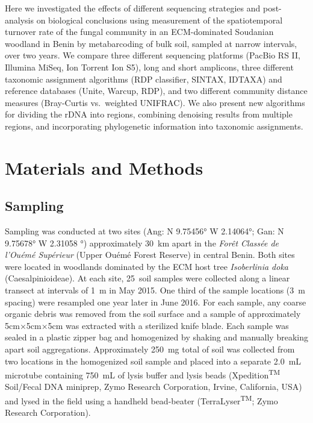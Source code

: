 \documentclass[
  12pt,
]{article}
\begin{document}
Here we investigated the effects of different sequencing strategies and post-analysis on biological conclusions using measurement of the spatiotemporal turnover rate of the fungal community in an ECM-dominated Soudanian woodland in Benin by metabarcoding of bulk soil, sampled at narrow intervals, over two years.
We compare three different sequencing platforms (PacBio RS II, Illumina MiSeq, Ion Torrent Ion S5), long and short amplicons, three different taxonomic assignment algorithms (RDP classifier, SINTAX, IDTAXA) and reference databases (Unite, Warcup, RDP), and two different community distance measures (Bray-Curtis vs.~weighted UNIFRAC).
We also present new algorithms for dividing the rDNA into regions, combining denoising results from multiple regions, and incorporating phylogenetic information into taxonomic assignments.

\hypertarget{materials-and-methods}{%
\section{Materials and Methods}\label{materials-and-methods}}

\hypertarget{sampling}{%
\subsection{Sampling}\label{sampling}}

Sampling was conducted at two sites (Ang: N 9.75456° W 2.14064°; Gan: N 9.75678° W 2.31058 °) approximately 30~km apart in the \emph{Forêt Classée de l'Ouémé Supérieur} (Upper Ouémé Forest Reserve) in central Benin.
Both sites were located in woodlands dominated by the ECM host tree \emph{Isoberlinia doka} (Caesalpinioideae).
At each site, 25~soil samples were collected along a linear transect at intervals of 1~m in May 2015.
One third of the sample locations (3~m spacing) were resampled one year later in June 2016.
For each sample, any coarse organic debris was removed from the soil surface and a sample of approximately 5cm×5cm×5cm was extracted with a sterilized knife blade.
Each sample was sealed in a plastic zipper bag and homogenized by shaking and manually breaking apart soil aggregations.
Approximately 250~mg total of soil was collected from two locations in the homogenized soil sample and placed into a separate 2.0~mL microtube containing 750~mL of lysis buffer and lysis beads (Xpedition\textsuperscript{TM} Soil/Fecal DNA miniprep, Zymo Research Corporation, Irvine, California, USA) and lysed in the field using a handheld bead-beater (TerraLyser\textsuperscript{TM}; Zymo Research Corporation).
\end{document}
